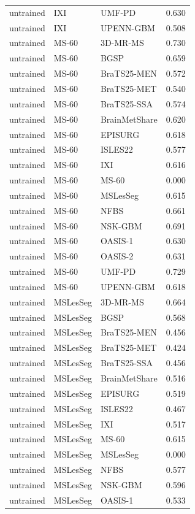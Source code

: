 \begin{tabular}{lllr}
untrained & IXI & UMF-PD & 0.630 \\
untrained & IXI & UPENN-GBM & 0.508 \\
untrained & MS-60 & 3D-MR-MS & 0.730 \\
untrained & MS-60 & BGSP & 0.659 \\
untrained & MS-60 & BraTS25-MEN & 0.572 \\
untrained & MS-60 & BraTS25-MET & 0.540 \\
untrained & MS-60 & BraTS25-SSA & 0.574 \\
untrained & MS-60 & BrainMetShare & 0.620 \\
untrained & MS-60 & EPISURG & 0.618 \\
untrained & MS-60 & ISLES22 & 0.577 \\
untrained & MS-60 & IXI & 0.616 \\
untrained & MS-60 & MS-60 & 0.000 \\
untrained & MS-60 & MSLesSeg & 0.615 \\
untrained & MS-60 & NFBS & 0.661 \\
untrained & MS-60 & NSK-GBM & 0.691 \\
untrained & MS-60 & OASIS-1 & 0.630 \\
untrained & MS-60 & OASIS-2 & 0.631 \\
untrained & MS-60 & UMF-PD & 0.729 \\
untrained & MS-60 & UPENN-GBM & 0.618 \\
untrained & MSLesSeg & 3D-MR-MS & 0.664 \\
untrained & MSLesSeg & BGSP & 0.568 \\
untrained & MSLesSeg & BraTS25-MEN & 0.456 \\
untrained & MSLesSeg & BraTS25-MET & 0.424 \\
untrained & MSLesSeg & BraTS25-SSA & 0.456 \\
untrained & MSLesSeg & BrainMetShare & 0.516 \\
untrained & MSLesSeg & EPISURG & 0.519 \\
untrained & MSLesSeg & ISLES22 & 0.467 \\
untrained & MSLesSeg & IXI & 0.517 \\
untrained & MSLesSeg & MS-60 & 0.615 \\
untrained & MSLesSeg & MSLesSeg & 0.000 \\
untrained & MSLesSeg & NFBS & 0.577 \\
untrained & MSLesSeg & NSK-GBM & 0.596 \\
untrained & MSLesSeg & OASIS-1 & 0.533 \\

\end{tabular}
